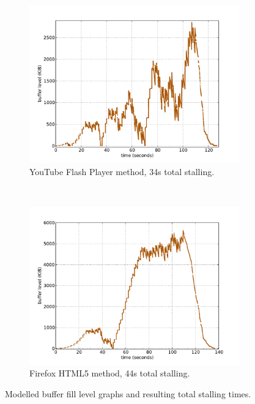 \begin{figure}
        \begin{subfigure}[b]{0.50\textwidth}
                \centering
                \includegraphics[width=\textwidth]{images/expose/bufferlevel-flash-new.pdf}
                \caption{YouTube Flash Player method, 34s total stalling.}
                \label{fig:expose-bufferlevel-flash}
        \end{subfigure}%
        ~
    	\begin{subfigure}[b]{0.50\textwidth}
                \centering
                \includegraphics[width=\textwidth]{images/expose/bufferlevel-firefox-new.pdf}
                \caption{Firefox HTML5 method, 44s total stalling.}
                \label{fig:expose-bufferlevel-firefox}
        \end{subfigure}
	\caption{Modelled buffer fill level graphs and resulting total stalling times.}
	\label{fig:expose-bufferlevel}
\end{figure}


